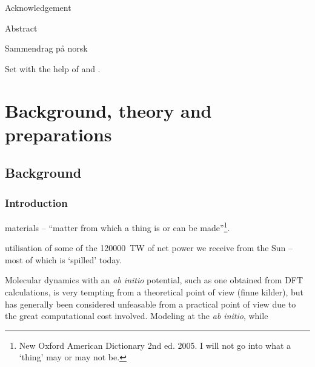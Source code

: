 \documentclass[11pt,bibliography=totoc,index=totoc]{scrbook}   %
\begin{document}
\frontmatter


Acknowledgement

Abstract

Sammendrag på norsk

Set with the help of {\LaTeXe} and {\KOMAScript}.


\tableofcontents

\mainmatter
\pagestyle{scrheadings}

\part{Background, theory and preparations}

\chapter{Background} %

\section{Introduction}


materials -- ``matter from which a thing is or can be made''\footnote{New Oxford American Dictionary 2nd ed. 2005. I will not 
go into what a `thing' may or may not be.}. 


utilisation of some of the \SI{120000}{\tera\watt}
of net power we receive from the Sun -- most of which is `spilled' today. 

Molecular dynamics with an \textit{ab initio} potential, such as one obtained from DFT calculations, is very tempting from a theoretical point of view (finne kilder), but has generally been considered unfeasable from a practical point of view due to the great computational cost involved.
Modeling at the \textit{ab initio}, while 
\end{document}
